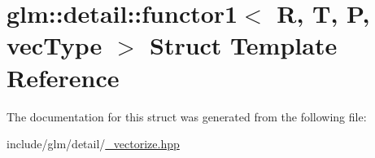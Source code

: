 \hypertarget{structglm_1_1detail_1_1functor1}{}\section{glm\+:\+:detail\+:\+:functor1$<$ R, T, P, vec\+Type $>$ Struct Template Reference}
\label{structglm_1_1detail_1_1functor1}


The documentation for this struct was generated from the following file\+:\begin{DoxyCompactItemize}
\item 
include/glm/detail/\hyperlink{__vectorize_8hpp}{\+\_\+vectorize.\+hpp}\end{DoxyCompactItemize}
